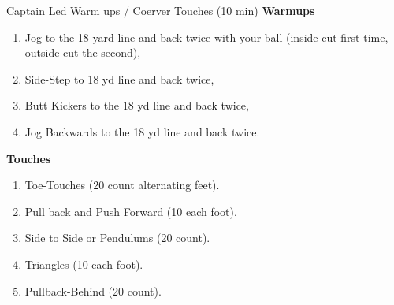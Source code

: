 \begin{agendablock}{Captain Led Warm ups / Coerver Touches (10 min)}
    \textbf{Warmups}
    \begin{enumerate}
        \item Jog to the 18 yard line and back twice with your ball (inside cut first time, outside cut the second),
        \item Side-Step to 18 yd line and back twice,
        \item Butt Kickers to the 18 yd line and back twice,
        \item Jog Backwards to the 18 yd line and back twice.
    \end{enumerate}
    \textbf{Touches}
    \begin{enumerate}
        \item Toe-Touches (20 count alternating feet).
        \item Pull back and Push Forward (10 each foot).
        \item Side to Side or Pendulums (20 count).
        \item Triangles (10 each foot).
        \item Pullback-Behind (20 count).
    \end{enumerate}
\end{agendablock}